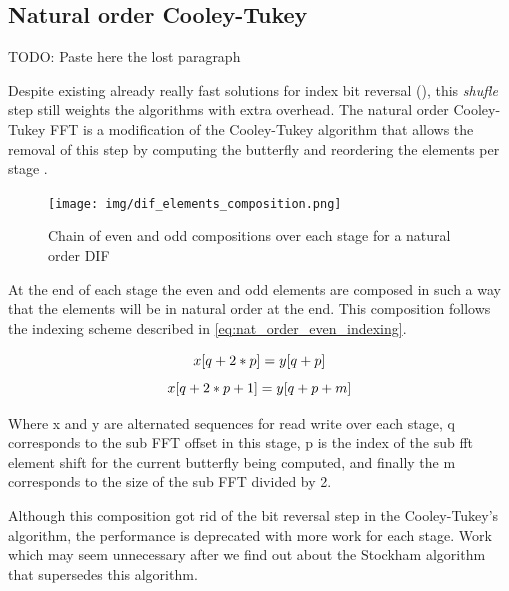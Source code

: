 \documentclass[
  oneside,
  11pt, a4paper,
  footinclude=true,
  headinclude=true,
  cleardoublepage=empty
]{scrbook}
\begin{document}
\subsection{Natural order Cooley-Tukey} \label{subsec:natural-order-ct}

TODO: Paste here the lost paragraph

Despite existing already really fast solutions for index bit reversal (\cite{prado2004new}), this \textit{shufle} step still weights the algorithms with extra overhead. The natural order Cooley-Tukey FFT is a modification of the Cooley-Tukey algorithm that allows the removal of this step by computing the butterfly and reordering the elements per stage \cite{OTFFTnoct}.

\begin{figure}[h] 
    \centering
    \texttt{[image: img/dif\_elements\_composition.png]}
    \caption{Chain of even and odd compositions over each stage for a natural order DIF}
    \label{fig:dif-elements-composition}
\end{figure}

At the end of each stage the even and odd elements are composed in such a way that the elements will be in natural order at the end. This composition follows the indexing scheme described in \autoref{eq:nat_order_even_indexing}.

\begin{equation} \label{eq:nat_order_even_indexing}
    x[q + 2*p] = y[q + p] \\
\end{equation}
\begin{equation} \label{eq:nat_order_odd_indexing}
    x[q + 2*p + 1] = y[q + p + m] \\
\end{equation}

Where x and y are alternated sequences for read write over each stage, q corresponds to the sub FFT offset in this stage, p is the index of the sub fft element shift for the current butterfly being computed, and finally the m corresponds to the size of the sub FFT divided by 2.

Although this composition got rid of the bit reversal step in the Cooley-Tukey's algorithm, the performance is deprecated with more work for each stage. Work which may seem unnecessary after we find out about the Stockham algorithm that supersedes this algorithm.
\end{document}
